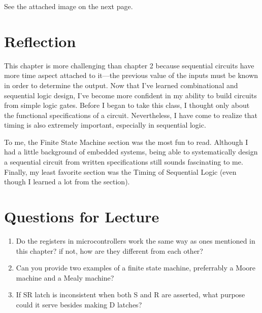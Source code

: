 \documentclass[12pt]{article}
\begin{document}
See the attached image on the next page.



\section{Reflection}

This chapter is more challenging than chapter 2 because sequential circuits have more time aspect attached to it---the previous value of the inputs must be known in order to determine the output. Now that I've learned combinational and sequential logic design, I've become more confident in my ability to build circuits from simple logic gates. Before I began to take this class, I thought only about the functional specifications of a circuit. Nevertheless, I have come to realize that timing is also extremely important, especially in sequential logic.

To me, the Finite State Machine section was the most fun to read. Although I had a little background of embedded systems, being able to systematically design a sequential circuit from written specifications still sounds fascinating to me. Finally, my least favorite section was the Timing of Sequential Logic (even though I learned a lot from the section).

\section{Questions for Lecture}

\begin{enumerate}
  \item Do the registers in microcontrollers work the same way as ones mentioned in this chapter? if not, how are they different from each other?
  \item Can you provide two examples of a finite state machine, preferrably a Moore machine and a Mealy machine?
  \item If SR latch is inconsistent when both S and R are asserted, what purpose could it serve besides making D latches?
\end{enumerate}
\end{document}
